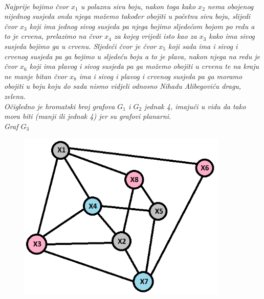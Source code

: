 \documentclass[12pt]{article}
\begin{document}
\begin{enumerate}
\begin{center}
\textit{\\Najprije bojimo čvor $x_1$ u polaznu sivu boju, nakon toga kako $x_2$ nema obojenog nijednog susjeda onda njega možemo također obojiti u početnu sivu boju, slijedi čvor $x_3$ koji ima jednog sivog susjeda pa njega bojimo sljedećom bojom po redu a to je crvena, prelazimo na čvor $x_4$ za kojeg vrijedi isto kao za $x_3$ kako ima sivog susjeda bojimo ga u crvenu. Sljedeći čvor je čvor $x_5$ koji sada ima i sivog i crvenog susjeda pa ga bojimo u sljedeću boju a to je plava, nakon njega na redu je čvor $x_6$ koji ima plavog i sivog susjeda pa ga možemo obojiti u crvenu te na kraju ne manje bitan čvor $x_8$ ima i sivog i plavog i crvenog susjeda pa ga moramo obojiti u boju koju do sada nismo vidjeli odnosno Nihadu Alibegoviću dragu, zelenu.\\ Očigledno je hromatski broj grafova $G_1$ i $G_2$ jednak 4, imajući u vidu da tako mora biti (manji ili jednak 4) jer su grafovi planarni.}\\
\vspace{0.5cm}
\textit{Graf $G_3$}
    \begin{figure}[htp]
    \centering
    \includegraphics[width=10cm]{g3obojen.png}
\end{figure}
   

\end{center}
\end{enumerate}
\end{document}

